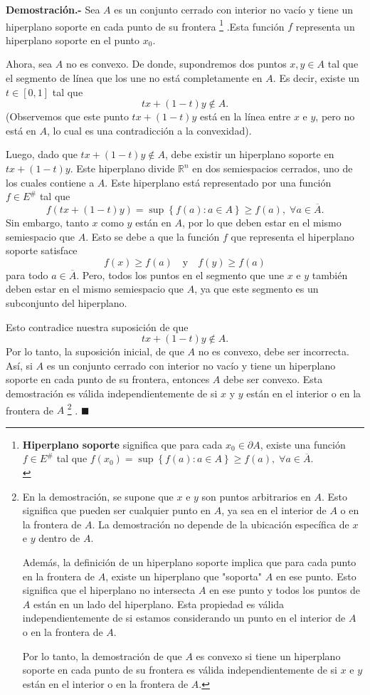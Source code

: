 \begin{enumerate}
	\textbf{Demostración.-}\; Sea  $A$ es un conjunto cerrado con interior no vacío y tiene un hiperplano soporte en cada punto de su frontera
	\footnote{
	    \textbf{Hiperplano soporte} significa que para cada $x_0 \in \partial A$, existe una función $f \in E^\#$ tal que $f(x_0) = \sup \left\{f(a):a\in A\right\}\geq f(a),\; \forall a\in \overline{A}$.\\
	\label{hipersoporte}}
	.Esta función $f$ representa un hiperplano soporte en el punto $x_0$.

	Ahora, sea $A$ no es convexo. De donde, supondremos dos puntos $x, y \in A$ tal que el segmento de línea que los une no está completamente en $A$. Es decir, existe un $t \in [0,1]$ tal que 
	$$tx + (1-t)y \notin A.$$ 
	(Observemos que este punto $tx + (1-t)y$ está en la línea entre $x$ e $y$, pero no está en $A$, lo cual es una contradicción a la convexidad).

	Luego, dado que $tx + (1-t)y \notin A$, debe existir un hiperplano soporte en $tx + (1-t)y$. Este hiperplano divide $\mathbb{R}^n$ en dos semiespacios cerrados, uno de los cuales contiene a $A$. Este hiperplano está representado por una función $f \in E^\#$ tal que 
	$$f(tx + (1-t)y) = \sup \left\{f(a):a\in A\right\}\geq f(a),\; \forall a\in \overline{A}.$$
	Sin embargo, tanto $x$ como $y$ están en $A$, por lo que deben estar en el mismo semiespacio que $A$. Esto se debe a que la función $f$ que representa el hiperplano soporte satisface 
	$$f(x) \geq f(a) \quad \text{y}\quad f(y) \geq f(a)$$ 
	para todo $a \in \overline{A}$. Pero, todos los puntos en el segmento que une $x$ e $y$ también deben estar en el mismo semiespacio que $A$, ya que este segmento es un subconjunto del hiperplano.

	Esto contradice nuestra suposición de que 
	$$tx + (1-t)y \notin A.$$ 
	Por lo tanto, la suposición inicial, de que $A$ no es convexo, debe ser incorrecta. Así, si $A$ es un conjunto cerrado con interior no vacío y tiene un hiperplano soporte en cada punto de su frontera, entonces $A$ debe ser convexo. Esta demostración es válida independientemente de si $x$ y $y$ están en el interior o en la frontera de $A$
	\footnote{
	    En la demostración, se supone que $x$ e $y$ son puntos arbitrarios en $A$. Esto significa que pueden ser cualquier punto en $A$, ya sea en el interior de $A$ o en la frontera de $A$. La demostración no depende de la ubicación específica de $x$ e $y$ dentro de $A$.

	    Además, la definición de un hiperplano soporte implica que para cada punto en la frontera de $A$, existe un hiperplano que "soporta" $A$ en ese punto. Esto significa que el hiperplano no intersecta $A$ en ese punto y todos los puntos de $A$ están en un lado del hiperplano. Esta propiedad es válida independientemente de si estamos considerando un punto en el interior de $A$ o en la frontera de $A$.

	    Por lo tanto, la demostración de que $A$ es convexo si tiene un hiperplano soporte en cada punto de su frontera es válida independientemente de si $x$ e $y$ están en el interior o en la frontera de $A$.
	}
	. $\blacksquare$

\end{enumerate}

